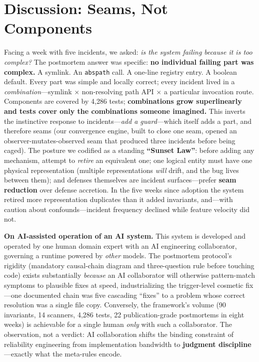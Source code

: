 \documentclass[conference]{IEEEtran}
\begin{document}
\section{Discussion: Seams, Not Components}\label{sec:discussion}
Facing a week with five incidents, we asked: \emph{is the system failing
because it is too complex?} The postmortem answer was specific:
\textbf{no individual failing part was complex.} A symlink. An
\texttt{abspath} call. A one-line registry entry. A boolean default. Every
part was simple and locally correct; every incident lived in a
\emph{combination}---symlink $\times$ non-resolving path API $\times$ a
particular invocation route. Components are covered by 4{,}286 tests;
\textbf{combinations grow superlinearly and tests cover only the
combinations someone imagined.} This inverts the instinctive response to
incidents---\emph{add a guard}---which itself adds a part, and therefore
seams (our convergence engine, built to close one seam, opened an
observer-mutates-observed seam that produced three incidents before being
caged). The posture we codified as a standing \textbf{``Sunset Law''}:
before adding any mechanism, attempt to \emph{retire} an equivalent one;
one logical entity must have one physical representation (multiple
representations \emph{will} drift, and the bug lives between them); and
defenses themselves are incident surfaces---prefer \textbf{seam reduction}
over defense accretion. In the five weeks since adoption the system
retired more representation duplicates than it added invariants, and---with
caution about confounds---incident frequency declined while feature
velocity did not.

\textbf{On AI-assisted operation of an AI system.} This system is
developed and operated by one human domain expert with an AI engineering
collaborator, governing a runtime powered by \emph{other} models. The
postmortem protocol's rigidity (mandatory causal-chain diagram and
three-question rule before touching code) exists substantially
\emph{because} an AI collaborator will otherwise pattern-match symptoms to
plausible fixes at speed, industrializing the trigger-level cosmetic
fix---one documented chain was five cascading ``fixes'' to a problem whose
correct resolution was a single file copy. Conversely, the framework's
volume (90 invariants, 14 scanners, 4{,}286 tests, 22 publication-grade
postmortems in eight weeks) is achievable for a single human \emph{only}
with such a collaborator. The observation, not a verdict: AI collaboration
shifts the binding constraint of reliability engineering from
implementation bandwidth to \textbf{judgment discipline}---exactly what
the meta-rules encode.
\end{document}
